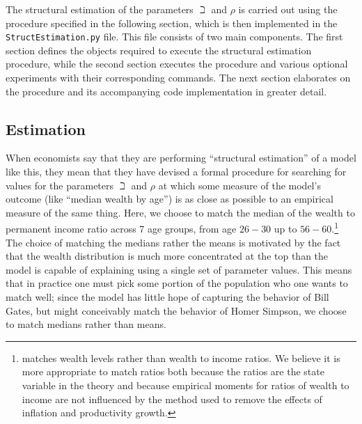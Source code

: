 \documentclass[titlepage, headings=optiontotocandhead]{econark}
\begin{document}
{The structural estimation of the parameters $\beth$ and $\rho$ is carried out using
the procedure specified in the following section, which is then implemented in
the \texttt{StructEstimation.py} file. This file consists of two main components. The
first section defines the objects required to execute the structural estimation procedure,
while the second section executes the procedure and various optional
experiments with their corresponding commands. The next section elaborates on the procedure
and its accompanying code implementation in greater detail.

\hypertarget{estimation}{}
\subsection{Estimation}

When economists say that they are performing ``structural estimation''
of a model like this, they mean that they have devised a
formal procedure for searching for values for the parameters $\beth$
and $\rho$ at which some measure of the model's outcome (like
``median wealth by age'') is as close as possible to an empirical measure
of the same thing. Here, we choose to match the median of the
wealth to permanent income ratio across 7 age groups, from age $26-30$
up to $56-60$.\footnote{\cite{cagettiWprofiles}
  matches wealth levels rather than wealth to income ratios. We
  believe it is more appropriate to match ratios both because the
  ratios are the state variable in the theory and because empirical
  moments for ratios of wealth to income are not influenced by the
  method used to remove the effects of inflation and productivity
  growth.} The choice of matching the medians rather the means is
motivated by the fact that the wealth distribution is much more
concentrated at the top than the model is capable of explaining using a single
set of parameter values.  This means that in practice one must pick
some portion of the population who one wants to match well; since the
model has little hope of capturing the behavior of Bill Gates, but
might conceivably match the behavior of Homer Simpson, we choose to
match medians rather than means.

}
\end{document}

